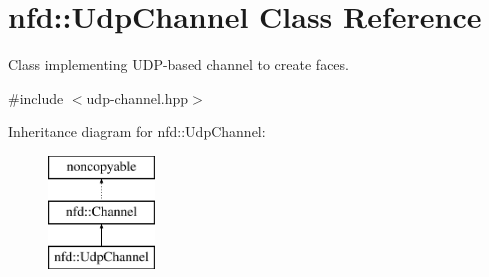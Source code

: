 \hypertarget{classnfd_1_1UdpChannel}{}\section{nfd\+:\+:Udp\+Channel Class Reference}
\label{classnfd_1_1UdpChannel}


Class implementing U\+D\+P-\/based channel to create faces.  




{\ttfamily \#include $<$udp-\/channel.\+hpp$>$}

Inheritance diagram for nfd\+:\+:Udp\+Channel\+:\begin{figure}[H]
\begin{center}
\leavevmode
\includegraphics[height=3.000000cm]{classnfd_1_1UdpChannel}
\end{center}
\end{figure}
